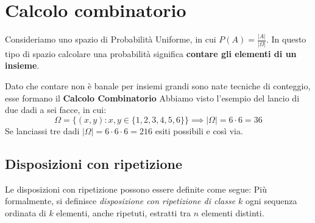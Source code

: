\pagebreak
\section{Calcolo combinatorio}
Consideriamo uno spazio di Probabilità Uniforme, in cui $P(A) = \frac{|A|}{|\Omega|}$.
In questo tipo di spazio calcolare una probabilità significa \textbf{contare gli elementi di un insieme}.

Dato che contare non è banale per insiemi grandi sono nate tecniche di conteggio,
esse formano il \textbf{Calcolo Combinatorio}
Abbiamo visto l'esempio del lancio di due dadi a sei facce, in cui:
  \[ \Omega=\{(x,y): x,y \in \{1,2,3,4,5,6\}\} \implies |\Omega| = 6\cdot6 = 36 \]
Se lanciassi tre dadi $|\Omega| = 6\cdot6\cdot 6 = 216$ esiti possibili e così via.

\subsection{Disposizioni con ripetizione}
Le disposizioni con ripetizione possono essere definite come segue:
Più formalmente, si definisce \emph{disposizione con ripetizione di classe $k$} ogni sequenza ordinata di $k$ elementi, 
anche ripetuti, estratti tra $n$ elementi distinti.

